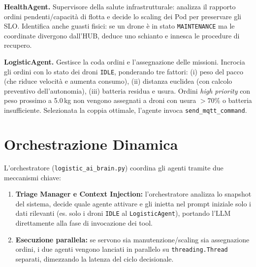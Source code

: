 \textbf{HealthAgent.} Supervisore della salute infrastrutturale: analizza il rapporto ordini pendenti/capacità di flotta e decide lo scaling dei Pod per preservare gli SLO. Identifica anche guasti fisici: se un drone è in stato \texttt{MAINTENANCE} ma le coordinate divergono dall'HUB, deduce uno schianto e innesca le procedure di recupero.

\textbf{LogisticAgent.} Gestisce la coda ordini e l'assegnazione delle missioni. Incrocia gli ordini con lo stato dei droni \texttt{IDLE}, ponderando tre fattori: (i) peso del pacco (che riduce velocità e aumenta consumo), (ii) distanza euclidea (con calcolo preventivo dell'autonomia), (iii) batteria residua e usura. Ordini \textit{high priority} con peso prossimo a 5.0\,kg non vengono assegnati a droni con usura $>70\%$ o batteria insufficiente. Selezionata la coppia ottimale, l'agente invoca \texttt{send\_mqtt\_command}.

\section{Orchestrazione Dinamica}
\label{sec:logistic_ai_brain}

L'orchestratore (\texttt{logistic\_ai\_brain.py}) coordina gli agenti tramite due meccanismi chiave:
\begin{enumerate}
    \item \textbf{Triage Manager e Context Injection:} l'orchestratore analizza lo snapshot del sistema, decide quale agente attivare e gli inietta nel prompt iniziale solo i dati rilevanti (es. solo i droni \texttt{IDLE} al \texttt{LogisticAgent}), portando l'LLM direttamente alla fase di invocazione dei tool.
    \item \textbf{Esecuzione parallela:} se servono sia manutenzione/scaling sia assegnazione ordini, i due agenti vengono lanciati in parallelo su \texttt{threading.Thread} separati, dimezzando la latenza del ciclo decisionale.
\end{enumerate}
